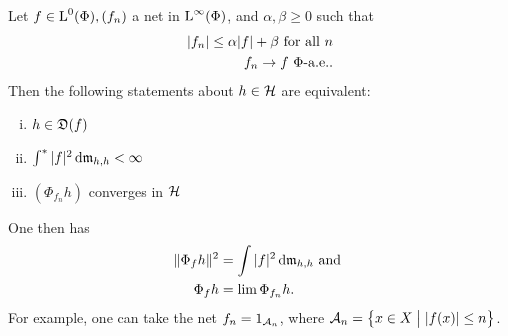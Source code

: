 \begin{lem}
  \label{maintheorem2}
Let $f \in {\text{L}^0}(\Phi), (f_n)$ a net in ${\text{L}^\infty}(\Phi)$, and 
$\alpha, \beta \geq 0$ such that
 \begin{align*}
   | f_n | \leq \alpha |f| + \beta \text{ for all } n \\
   f_n \to f ~\Phi\text{-a.e.}.
 \end{align*}
Then the following statements about $h \in \mathcal{H}$ are equivalent:
\begin{enumerate}[(i)]
 \item $h \in \mathfrak{D}(f)$
 \item $\int ^{*} | f| ^2 \operatorname{d}\! \mathfrak{m}_{h,h} < \infty$
 \item $(\Phi_{f_n}h)$ converges in $ \mathcal{H}$
\end{enumerate}
One then has
\begin{align*}
  \| \Phi_f h \| ^2 &= \int |f|^2 \operatorname{d}\! \mathfrak{m}_{h, h } \text{ and }\\
  \Phi_{f }h &= \lim \Phi_{f_n} h.
\end{align*}
For example, one can take the net $f_n = 1_{\mathcal{A}_n}$, where $\mathcal{A}_n = 
\left\lbrace x \in X \bigm | | f(x) | \leq n \right\rbrace$.
\end{lem}





